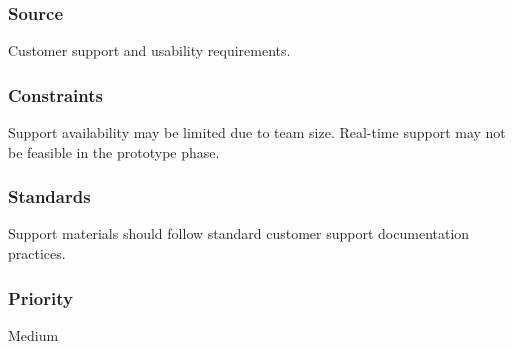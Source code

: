 \subsubsection{Source}
Customer support and usability requirements.

\subsubsection{Constraints}
Support availability may be limited due to team size. Real-time support may not be feasible in the prototype phase.

\subsubsection{Standards}
Support materials should follow standard customer support documentation practices.

\subsubsection{Priority}
Medium